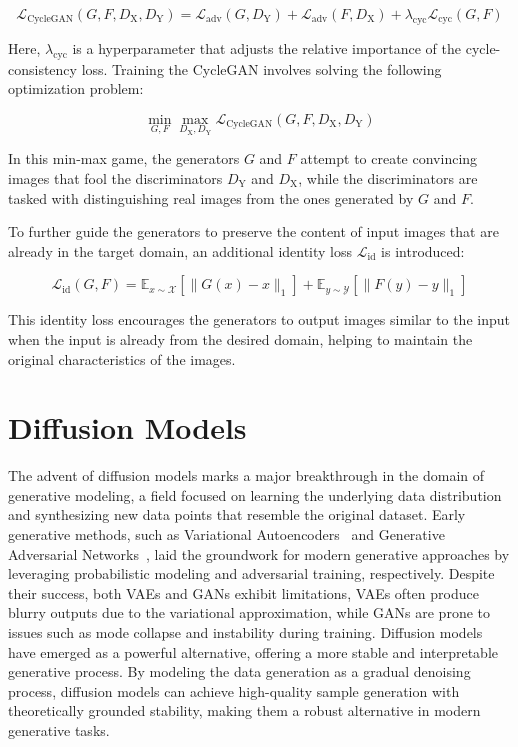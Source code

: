 \documentclass[12pt,DIV14,BCOR12mm,a4paper,footinclude=false,headinclude,parskip=half-,twoside,openright,cleardoublepage=empty,toc=index,bibliography=totoc,listof=totoc]{scrreprt}
\numberwithin{equation}{chapter}
\begin{document}
\begin{equation}
\mathcal{L}_{\text{CycleGAN}}(G, F, D_{\text{X}}, D_{\text{Y}}) = \mathcal{L}_{\text{adv}}(G, D_{\text{Y}}) + \mathcal{L}_{\text{adv}}(F, D_{\text{X}}) + \lambda_{\text{cyc}} \mathcal{L}_{\text{cyc}}(G, F)
\end{equation}

Here, \(\lambda_{\text{cyc}}\) is a hyperparameter that adjusts the relative importance of the cycle-consistency loss. Training the CycleGAN involves solving the following optimization problem:

\begin{equation}
\min_{G, F} \max_{D_{\text{X}}, D_{\text{Y}}} \mathcal{L}_{\text{CycleGAN}}(G, F, D_{\text{X}}, D_{\text{Y}})
\end{equation}

In this min-max game, the generators \(G\) and \(F\) attempt to create convincing images that fool the discriminators \(D_{\text{Y}}\) and \(D_{\text{X}}\), while the discriminators are tasked with distinguishing real images from the ones generated by \(G\) and \(F\).

To further guide the generators to preserve the content of input images that are already in the target domain, an additional identity loss \(\mathcal{L}_{\text{id}}\) is introduced:

\begin{equation}
\mathcal{L}_{\text{id}}(G, F) = \mathbb{E}_{x \sim \mathcal{X}} [\| G(x) - x \|_1] + \mathbb{E}_{y \sim \mathcal{Y}} [\| F(y) - y \|_1]
\end{equation}

This identity loss encourages the generators to output images similar to the input when the input is already from the desired domain, helping to maintain the original characteristics of the images.
\section{Diffusion Models}
\label{sec:diffusion_model_theory}
The advent of diffusion models marks a major breakthrough in the domain of generative modeling, a field focused on learning the underlying data distribution and synthesizing new data points that resemble the original dataset. Early generative methods, such as Variational Autoencoders~\cite{VAE} and Generative Adversarial Networks~\cite{goodfellow2014generative}, laid the groundwork for modern generative approaches by leveraging probabilistic modeling and adversarial training, respectively. Despite their success, both VAEs and GANs exhibit limitations, VAEs often produce blurry outputs due to the variational approximation, while GANs are prone to issues such as mode collapse and instability during training. Diffusion models~\cite{diffusion1,diffusion2} have emerged as a powerful alternative, offering a more stable and interpretable generative process. By modeling the data generation as a gradual denoising process, diffusion models can achieve high-quality sample generation with theoretically grounded stability, making them a robust alternative in modern generative tasks.
\end{document}
